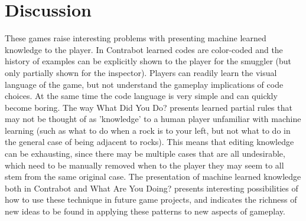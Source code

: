 \documentclass{sig-alternate}
\begin{document}
\section{Discussion}
These games raise interesting problems with presenting machine learned knowledge to the player.
In {\sc Contrabot} learned codes are color-coded and the history of examples can be explicitly shown to the player for the smuggler (but only partially shown for the inspector).
Players can readily learn the visual language of the game, but not understand the gameplay implications of code choices.
At the same time the code language is very simple and can quickly become boring.
The way {\sc What Did You Do?} presents learned partial rules that may not be thought of as 'knowledge' to a human player unfamiliar with machine learning (such as what to do when a rock is to your left, but not what to do in the general case of being adjacent to rocks).
This means that editing knowledge can be exhausting, since there may be multiple cases that are all undesirable, which need to be manually removed when to the player they may seem to all stem from the same original case.
%
The presentation of machine learned knowledge both in {\sc Contrabot} and {\sc What Are You Doing?} presents interesting possibilities of how to use these technique in future game projects, and indicates the richness of new ideas to be found in applying these patterns to new aspects of gameplay.


%
%
\end{document}
